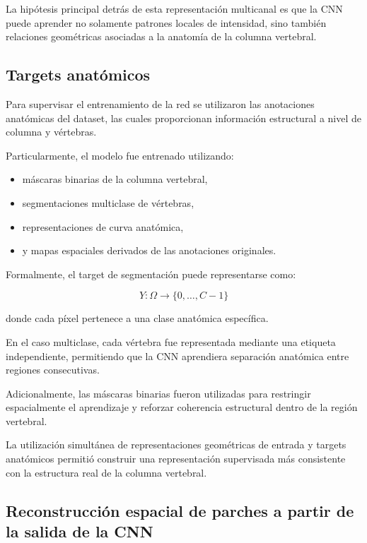\documentclass[conference]{IEEEtran}
\begin{document}
La hipótesis principal detrás de esta representación multicanal es que la CNN puede aprender no solamente patrones locales de intensidad, sino también relaciones geométricas asociadas a la anatomía de la columna vertebral.

\subsection{Targets anatómicos}

Para supervisar el entrenamiento de la red se utilizaron las anotaciones anatómicas del dataset, las cuales proporcionan información estructural a nivel de columna y vértebras.

Particularmente, el modelo fue entrenado utilizando:

\begin{itemize}
    \item máscaras binarias de la columna vertebral,
    \item segmentaciones multiclase de vértebras,
    \item representaciones de curva anatómica,
    \item y mapas espaciales derivados de las anotaciones originales.
\end{itemize}

Formalmente, el target de segmentación puede representarse como:

\[
Y:\Omega \rightarrow \{0,\dots,C-1\}
\]

donde cada píxel pertenece a una clase anatómica específica.

En el caso multiclase, cada vértebra fue representada mediante una etiqueta independiente, permitiendo que la CNN aprendiera separación anatómica entre regiones consecutivas.

Adicionalmente, las máscaras binarias fueron utilizadas para restringir espacialmente el aprendizaje y reforzar coherencia estructural dentro de la región vertebral.

La utilización simultánea de representaciones geométricas de entrada y targets anatómicos permitió construir una representación supervisada más consistente con la estructura real de la columna vertebral.





\subsection{Reconstrucción espacial de parches a partir de la salida de la CNN}
\end{document}
